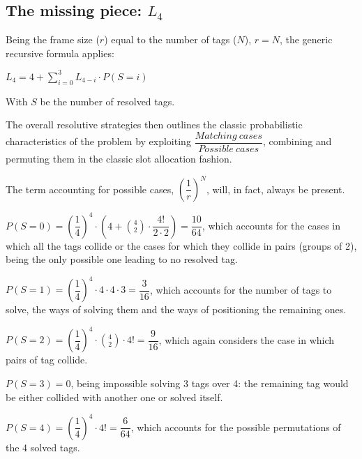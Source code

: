 \documentclass[a4paper,11pt]{article} %
\begin{document}
\setcounter{subsection}{-1}

\subsection{The missing piece: $L_4$}\label{computation-L4}

Being the frame size ($r$) equal to the number of tags ($N$), $r = N$, the generic recursive formula applies:

\smallskip

$L_4 = 4 + \displaystyle\sum_{i = 0}^{3} L_{4-i} \cdot P(S = i)$

\smallskip

With $S$ be the number of resolved tags.

\medskip

The overall resolutive strategies then outlines the classic probabilistic characteristics of the problem by exploiting $\dfrac{Matching\ cases}{Possible\ cases}$, combining and permuting them in the classic slot allocation fashion.

\smallskip

The term accounting for possible cases, $\left(\dfrac{1}{r}\right)^N$, will, in fact, always be present.

\medskip

$P(S = 0) = \left(\dfrac{1}{4}\right)^4 \cdot \left(4 + \displaystyle\binom{4}{2} \cdot \dfrac{4!}{2 \cdot 2}\right) = \dfrac{10}{64}$, which accounts for the cases in which all the tags collide or the cases for which they collide in pairs (groups of 2), being the only possible one leading to no resolved tag.

\medskip

$P(S = 1) = \left(\dfrac{1}{4}\right)^4 \cdot 4 \cdot 4 \cdot 3 = \dfrac{3}{16}$, which accounts for the number of tags to solve, the ways of solving them and the ways of positioning the remaining ones.

\medskip

$P(S = 2) = \left(\dfrac{1}{4}\right)^4 \cdot \displaystyle \binom{4}{2} \cdot 4! = \dfrac{9}{16}$, which again considers the case in which pairs of tag collide.

\medskip

$P(S = 3) = 0$, being impossible solving 3 tags over 4: the remaining tag would be either collided with another one or solved itself.

\medskip

$P(S = 4) = \left(\dfrac{1}{4}\right)^4 \cdot 4! = \dfrac{6}{64}$, which accounts for the possible permutations of the 4 solved tags.
\end{document}
